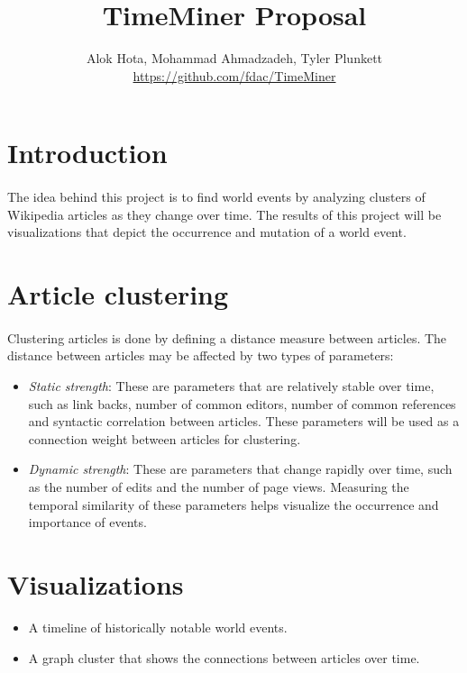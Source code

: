 \documentclass[11pt]{article}
\title{\textbf{TimeMiner Proposal}}
\author{Alok Hota, Mohammad Ahmadzadeh, Tyler Plunkett\\\href{https://github.com/fdac/TimeMiner}{https://github.com/fdac/TimeMiner}}
\begin{document}
\maketitle

\section{Introduction}
\paragraph{}
The idea behind this project is to find world events by analyzing clusters of Wikipedia articles as they change over time. The results of this project will be visualizations that depict the occurrence and mutation of a world event.

\section{Article clustering}
\paragraph{}
Clustering articles is done by defining a distance measure between articles. The distance between articles may be affected by two types of parameters:
	\begin{itemize}
		\item \textit{Static strength}: These are parameters that are relatively stable over time, such as link backs, number of common editors, number of common references and syntactic correlation between articles. These parameters will be used as a connection weight between articles for clustering.
		\item \textit{Dynamic strength}: These are parameters that change rapidly over time, such as the number of edits and the number of page views. Measuring the temporal similarity of these parameters helps visualize the occurrence and importance of events.
	\end{itemize}

\section{Visualizations}
\begin{itemize}
	\item A timeline of historically notable world events.
	\item A graph cluster that shows the connections between articles over time. 
\end{itemize}
\end{document}
